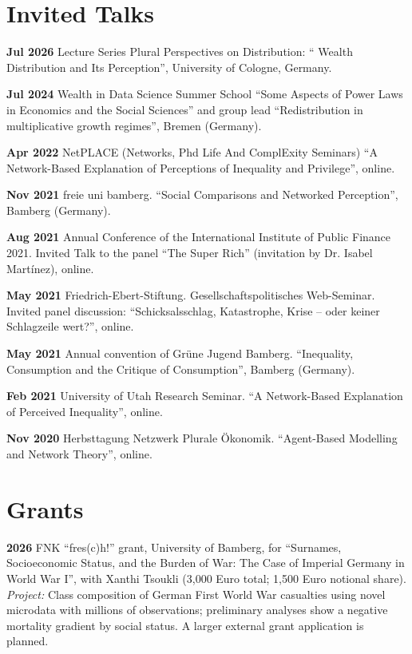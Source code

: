 \documentclass[margin]{res}
\begin{document}
\begin{resume}
	\section{Invited Talks} 
	\textbf{Jul 2026} Lecture Series Plural Perspectives on Distribution: `` Wealth Distribution and Its Perception'', University of Cologne, Germany.
	
	\textbf{Jul 2024} Wealth in Data Science Summer School ``Some Aspects of Power Laws in Economics and the Social Sciences'' and group lead ``Redistribution in multiplicative growth regimes'', Bremen (Germany).
	
	\textbf{Apr 2022} NetPLACE (Networks, Phd Life And ComplExity Seminars) ``A Network-Based Explanation of Perceptions of Inequality and Privilege'', online.
	
	\textbf{Nov 2021} freie uni bamberg. ``Social Comparisons and Networked Perception'', Bamberg (Germany).
	
	\textbf{Aug 2021} Annual Conference of the International Institute of Public Finance 2021. Invited Talk to the panel ``The Super Rich'' (invitation by Dr. Isabel Mart\'inez), online.
	
	\textbf{May 2021} Friedrich-Ebert-Stiftung. Gesellschaftspolitisches Web-Seminar. Invited panel discussion: ``Schicksalsschlag, Katastrophe, Krise -- oder keiner Schlagzeile wert?'', online.
	
	
	\textbf{May 2021} Annual convention of Gr\"une Jugend Bamberg. ``Inequality, Consumption and the Critique of Consumption'', Bamberg (Germany).
	
	\textbf{Feb 2021} University of Utah Research Seminar. ``A Network-Based Explanation of Perceived Inequality'', online.
	
	\textbf{Nov 2020} Herbsttagung Netzwerk Plurale \"Okonomik. ``Agent-Based Modelling and Network Theory'', online.
	
	\section{Grants}
	\textbf{2026} FNK ``fres(c)h!'' grant, University of Bamberg, for ``Surnames, Socioeconomic Status, and the Burden of War: The Case of Imperial Germany in World War I'', with Xanthi Tsoukli (3,000 Euro total; 1,500 Euro notional share). \textit{Project:} Class composition of German First World War casualties using novel microdata with millions of observations; preliminary analyses show a negative mortality gradient by social status. A larger external grant application is planned.
	

\end{resume}
\end{document}
